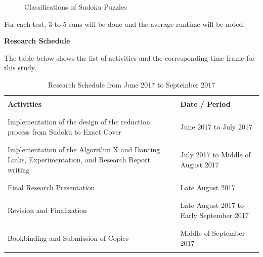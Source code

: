 \documentclass[a4paper,oneside,11pt]{report}
\begin{document}
\begin{figure}[h]
  \hspace{2cm}
  \caption{Classifications of Sudoku Puzzles}
\end{figure}
\noindent For each test, 3 to 5 runs will be done and the average runtime will be noted.

\newpage
\begin{center}
\LARGE \textbf{Research Schedule}
\newline
\end{center}

The table below shows the list of activities and the corresponding time frame for this study.
\begin{table}[!ht]
\begin{center}
\begin{tabular}{p{3.75in} | p{2in}}
\hline
&\\
\textbf{Activities} & \textbf{Date / Period}\\
&\\
\hline
\hline
&\\
Implementation of the design of the reduction process from Sudoku to Exact Cover & June 2017 to July 2017\\
&\\
\hline
&\\
Implementation of the Algorithm X and Dancing Links, Experimentation, and Research Report writing & July 2017 to Middle of August 2017\\
&\\
\hline
&\\
Final Research Presentation & Late August 2017\\
&\\
\hline
&\\
Revision and Finalization & Late August 2017 to Early September 2017\\
&\\
\hline
&\\
Bookbinding and Submission of Copies & Middle of September 2017\\
&\\
\hline
\end{tabular}
\end{center}
\caption{Research Schedule from June 2017 to September 2017}
\end{table}

\nocite{*}

\end{document}
